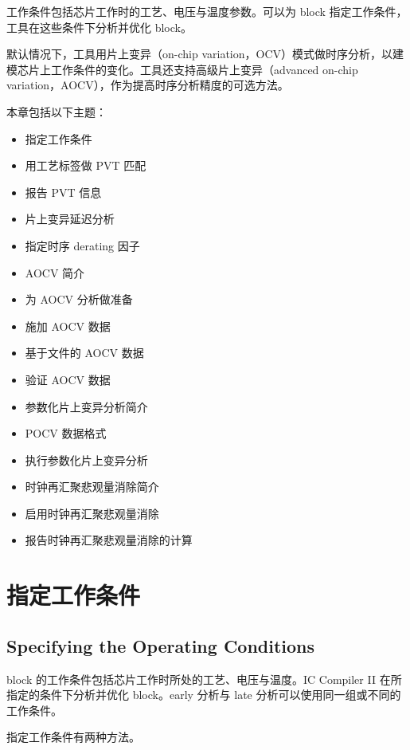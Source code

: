 \label{chap:ocv}

工作条件包括芯片工作时的工艺、电压与温度参数。可以为 block 指定工作条件，工具在这些条件下分析并优化 block。

默认情况下，工具用片上变异（on-chip variation，OCV）模式做时序分析，以建模芯片上工作条件的变化。工具还支持高级片上变异（advanced on-chip variation，AOCV），作为提高时序分析精度的可选方法。

本章包括以下主题：
\begin{itemize}
  \item 指定工作条件
  \item 用工艺标签做 PVT 匹配
  \item 报告 PVT 信息
  \item 片上变异延迟分析
  \item 指定时序 derating 因子
  \item AOCV 简介
  \item 为 AOCV 分析做准备
  \item 施加 AOCV 数据
  \item 基于文件的 AOCV 数据
  \item 验证 AOCV 数据
  \item 参数化片上变异分析简介
  \item POCV 数据格式
  \item 执行参数化片上变异分析
  \item 时钟再汇聚悲观量消除简介
  \item 启用时钟再汇聚悲观量消除
  \item 报告时钟再汇聚悲观量消除的计算
\end{itemize}

\section{指定工作条件}
\subsection*{Specifying the Operating Conditions}

block 的工作条件包括芯片工作时所处的工艺、电压与温度。IC Compiler II 在所指定的条件下分析并优化 block。early 分析与 late 分析可以使用同一组或不同的工作条件。

指定工作条件有两种方法。

